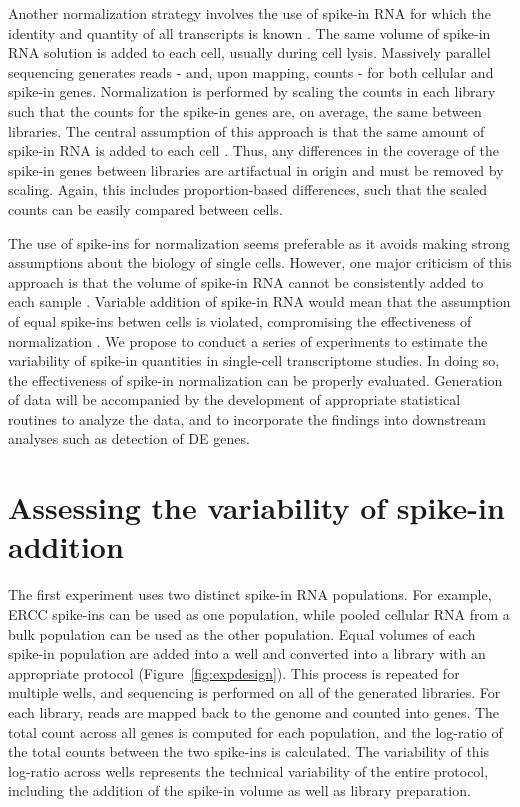 \documentclass{article}
\begin{document}
Another normalization strategy involves the use of spike-in RNA for which the identity and quantity of all transcripts is known \cite{stegle2015computational}.
The same volume of spike-in RNA solution is added to each cell, usually during cell lysis. 
Massively parallel sequencing generates reads - and, upon mapping, counts - for both cellular and spike-in genes.
Normalization is performed by scaling the counts in each library such that the counts for the spike-in genes are, on average, the same between libraries.
The central assumption of this approach is that the same amount of spike-in RNA is added to each cell \cite{marinov2014singlecell,stegle2015computational}.
Thus, any differences in the coverage of the spike-in genes between libraries are artifactual in origin and must be removed by scaling.
Again, this includes proportion-based differences, such that the scaled counts can be easily compared between cells. 

The use of spike-ins for normalization seems preferable as it avoids making strong assumptions about the biology of single cells.
However, one major criticism of this approach is that the volume of spike-in RNA cannot be consistently added to each sample \cite{robinson2010tmm}.
Variable addition of spike-in RNA would mean that the assumption of equal spike-ins betwen cells is violated, compromising the effectiveness of normalization \cite{risso2014normalization}.
We propose to conduct a series of experiments to estimate the variability of spike-in quantities in single-cell transcriptome studies.
In doing so, the effectiveness of spike-in normalization can be properly evaluated.
Generation of data will be accompanied by the development of appropriate statistical routines to analyze the data, and to incorporate the findings into downstream analyses such as detection of DE genes.


\section{Assessing the variability of spike-in addition}
The first experiment uses two distinct spike-in RNA populations.
For example, ERCC spike-ins can be used as one population, while pooled cellular RNA from a bulk population can be used as the other population.
Equal volumes of each spike-in population are added into a well and converted into a library with an appropriate protocol (Figure~\ref{fig:expdesign}).
This process is repeated for multiple wells, and sequencing is performed on all of the generated libraries.
For each library, reads are mapped back to the genome and counted into genes.
The total count across all genes is computed for each population, and the log-ratio of the total counts between the two spike-ins is calculated.
The variability of this log-ratio across wells represents the technical variability of the entire protocol, including the addition of the spike-in volume as well as library preparation.
\end{document}
